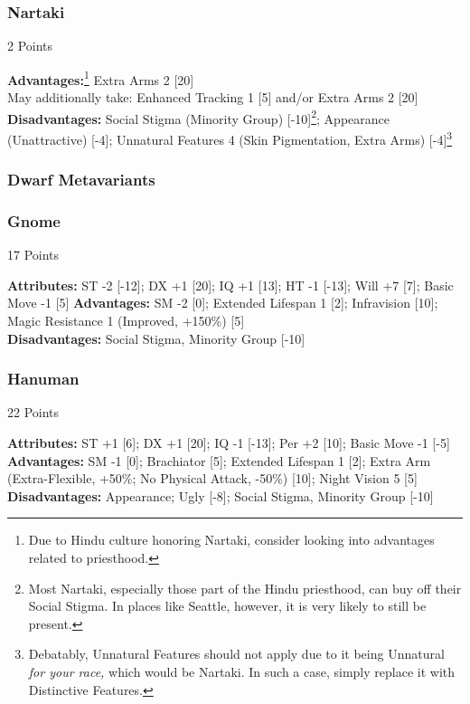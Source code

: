 \begin{multicols*}{3}
	\subsubsection*{Nartaki}
	\begin{flushright}
		2 Points
	\end{flushright}
	\textbf{Advantages:}\footnote{Due to Hindu culture honoring Nartaki, consider looking into advantages related to priesthood.} 
	Extra Arms 2 [20]
	\\May additionally take: Enhanced Tracking 1 [5] and/or Extra Arms 2 [20]
	\\\textbf{Disadvantages:} 
	Social Stigma (Minority Group) [-10]\footnote{Most Nartaki, especially those part of the Hindu priesthood, can buy off their Social Stigma. In places like Seattle, however, it is very likely to still be present.}; Appearance (Unattractive) [-4]; Unnatural Features 4 (Skin Pigmentation, Extra Arms) [-4]\footnote{Debatably, Unnatural Features should not apply due to it being Unnatural \textit{for your race,} which would be Nartaki. In such a case, simply replace it with Distinctive Features.}
	
	\subsubsection{Dwarf Metavariants}
	
	\subsubsection*{Gnome}
	\begin{flushright}
		17 Points
	\end{flushright}
	\textbf{Attributes:}
	ST -2 [-12]; DX +1 [20]; IQ +1 [13]; HT -1 [-13]; Will +7 [7]; Basic Move -1 [5]
	\textbf{Advantages:}
	SM -2 [0]; Extended Lifespan 1 [2]; Infravision [10]; Magic Resistance 1 (Improved, +150\%) [5]
	\\\textbf{Disadvantages:} 
	Social Stigma, Minority Group [-10]
	
	\subsubsection*{Hanuman}
	\begin{flushright}
		22 Points
	\end{flushright}
	\textbf{Attributes:}
	ST +1 [6]; DX +1 [20]; IQ -1 [-13]; Per +2 [10]; Basic Move -1 [-5]
	\textbf{Advantages:}
	SM -1 [0]; Brachiator [5]; Extended Lifespan 1 [2]; Extra Arm (Extra-Flexible, +50\%; No Physical Attack, -50\%) [10]; Night Vision 5 [5]
	\\\textbf{Disadvantages:} 
	Appearance; Ugly [-8]; Social Stigma, Minority Group [-10]
	

\end{multicols*}
